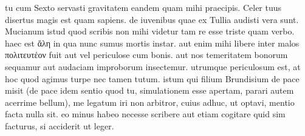  tu cum Sexto servasti gravitatem eandem quam mihi praecipis. Celer tuus disertus magis est quam sapiens. de iuvenibus quae ex Tullia audisti vera sunt. Mucianum istud quod scribis non mihi videtur tam re esse triste quam verbo. haec est ἄλη in qua nunc sumus mortis instar. aut enim mihi libere inter malos πολιτευτέον fuit aut vel periculose cum bonis. aut nos temeritatem bonorum sequamur aut audaciam improborum insectemur. utrumque periculosum est, at hoc quod agimus turpe nec tamen tutum. istum qui filium Brundisium de pace misit (de pace idem sentio quod tu, simulationem esse apertam, parari autem acerrime bellum), me legatum iri non arbitror, cuius adhuc, ut optavi, mentio facta nulla sit. eo minus habeo necesse scribere aut etiam cogitare quid sim facturus, si acciderit ut leger.
